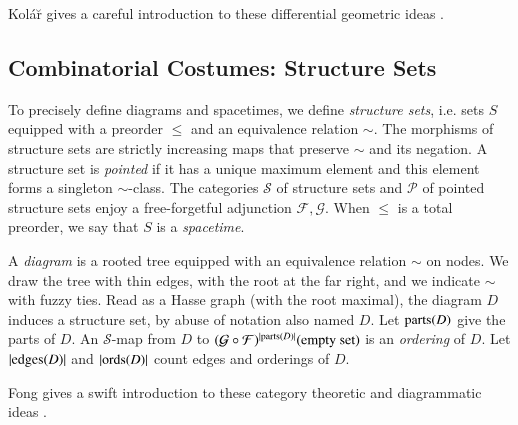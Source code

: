\documentclass{article}
\newcommand{\Free}{\mathcal{F}}
\newcommand{\Forg}{\mathcal{G}}
\newcommand{\edges}{\text{\textnormal{edges}}}
\newcommand{\ords}{\text{\textnormal{ords}}}
\newcommand{\parts}{\text{\textnormal{parts}}}
\newcommand{\Pp}{\mathcal{P}}
\newcommand{\Ss}{\mathcal{S}}
\begin{document}
        Kol\'{a}\u{r} gives a careful introduction to these differential
        geometric ideas .

    
    \subsection{Combinatorial Costumes: Structure Sets}
        To precisely define diagrams and spacetimes, we define \emph{structure
        sets}, i.e. sets $S$ equipped with a preorder $\leq$ and an equivalence
        relation $\sim$.  The morphisms of structure sets are strictly
        increasing maps that preserve $\sim$ and its negation.  A structure set
        is \emph{pointed} if it has a unique maximum element and this element
        forms a singleton $\sim$-class.  The categories $\Ss$ of structure sets
        and $\Pp$ of pointed structure sets enjoy a free-forgetful adjunction
        $\Free, \Forg$.  When $\leq$ is a total preorder, we say that $S$ is
        a \emph{spacetime}.
    
        A \emph{diagram} is a rooted tree equipped with an equivalence relation
        $\sim$ on nodes.  We draw the tree with thin edges, with the root at
        the far right, and we indicate $\sim$ with fuzzy ties.  Read as a Hasse
        graph (with the root maximal), the diagram $D$ induces a structure set,
        by abuse of notation also named $D$.  Let $\parts(D)$ give the parts of
        $D$.  An $\Ss$-map from $D$ to
        $(\Forg\circ\Free)^{|\parts(D)|}(\text{empty set})$ is an \emph{ordering} of $D$.
        Let $|\edges(D)|$ and
        $|\ords(D)|$ count edges and orderings of $D$.
    
        Fong gives a swift introduction to these category theoretic and
        diagrammatic ideas .
            
\end{document}

